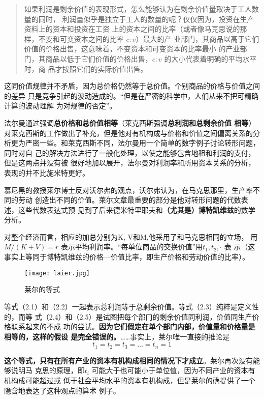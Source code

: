 \begin{quotation}
  如果利润是剩余价值的表现形式，怎么能够认为在剩余价值量取决于工人数量的同时，
  利润量似乎是独立于工人的数量的呢？仅仅因为，投资在生产资料上的资本和投资在工资
  上的资本之间的比率（或者像马克思说的那样，不变和可变资本之间的比率 $c:v$）最大的产
  业部门，其商品以高于它们价值的价格出售，这意味着，不变资本和可变资本的比率最小
  的产业部门，其商品以低于它们价值的价格出售，$c:v$ 的大小代表着明确的平均水平时，商
  品才按照它们的实际价值出售。
\end{quotation}

这同价值规律并不矛盾，因为总价格仍然等于总价值。个别商品的价格与价值之间的差异
只是竞争引起的波动造成的。“但是在严密的科学中，人们从来不把可精确计算的波动理解
为对规律的否定”。

法尔曼通过强调\textbf{总价格和总价值相等}（莱克西斯强调\textbf{总利润和总剩余价值
  相等}）对莱克西斯的工作做出了补充，但是他对有机构成与价格和价值之间偏离关系的分
析更为严密一些。和莱克西斯不同，法尔曼用一个简单的数字例子讨论转形问题，同时对自
己的解决方法进行了一般化处理，以使之能够包含地租和利润的支付，但是这两点并没有被
很好地加以展开，法尔曼对利润率和所用资本关系的分析，表现的并不比施米特更好。

慕尼黑的教授莱尔博士反对沃尔弗的观点，沃尔弗认为，在马克思那里，生产率不同的劳动
创造出不同的价值。莱尔文章最重要的部分是他对转形问题的代数表述，这些代数表达式预
见到了后来德米特里耶夫和\textbf{（尤其是）博特凯维兹}的数学分析。

对整个经济而言，相应的加总分别为K, V和M,他采用了和马克思相同的立场，
用$M/(K+V)=r$ 表示平均利润率。“每单位商品的交换价值”用$t_1, t_2, \cdot $ 表
示（这事实上等同于博特凯维兹的价格—价值比率，即生产价格和劳动价值的比率）。

\begin{figure}
\centering
\texttt{[image: laier.jpg]}
\caption{莱尔的等式}
\label{fig:laier}
\end{figure}

等式（2.1）和（2.2）一起表示总利润等于总剩余价值。等式（2.3）纯粹是定义性的，而等
式（2.4）和（2.5）是试图把每个部门的剩余价值同利润，价值同生产价格联系起来的不成
功的尝试。\textbf{因为它们假定在单个部门内部，价值量和价格量是相等的，这样的假设
  是完全错误的。}……事实上，莱尔唯一直接的推论是\[t_1=t_2=t_3= \ldots = t_n=1 \]

\textbf{这个等式，只有在所有产业的资本有机构成相同的情况下才成立}。莱尔再次没有能够说明马
克思的原理，即$t_i$ 可能大于也可能小于单位值，因为不同产业的资本有机构成可能超过或
低于社会平均水平的资本有机构成，但是莱尔的确提供了一个隐含地表达了这种观点的算术
例子。

